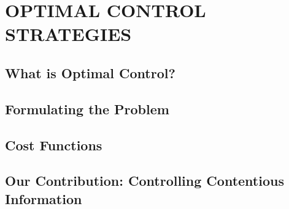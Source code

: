 \chapter{OPTIMAL CONTROL STRATEGIES}

\section{What is Optimal Control?}

\section{Formulating the Problem}

\section{Cost Functions}

\section{Our Contribution: Controlling Contentious Information}
